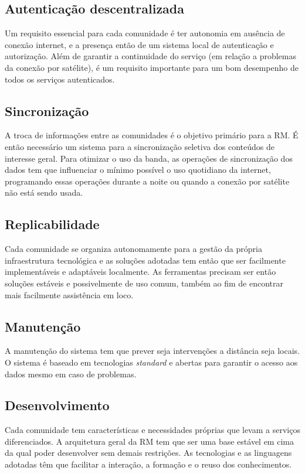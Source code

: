 \subsection{Autenticação descentralizada}
\label{sec:AutDec}
Um requisito essencial para cada comunidade é ter autonomia em
ausência de conexão internet, e a presença então de um sistema local
de autenticação e autorização. Além de garantir a continuidade do
serviço (em relação a problemas da conexão por satélite), é um
requisito importante para um bom desempenho de todos os serviços autenticados. 

\subsection{Sincronização}\label{sec:Sinc}
A troca de informações entre as comunidades é o objetivo primário para
a RM. É então necessário um sistema para a sincronização seletiva dos
conteúdos de interesse geral. Para otimizar o uso da banda, as
operações de sincronização dos dados tem que influenciar o mínimo
possível o uso quotidiano da internet, programando essas operações
durante a noite ou quando a conexão por satélite não está sendo usada.

\subsection{Replicabilidade}
Cada comunidade se organiza autonomamente para a gestão da própria
infraestrutura tecnológica e as soluções adotadas tem então que ser
facilmente implementáveis e adaptáveis localmente. As ferramentas
precisam ser então soluções estáveis e possivelmente de uso comum,
também ao fim de encontrar mais facilmente assistência em loco. 

\subsection{Manutenção}
A manutenção do sistema tem que prever seja intervenções a distância
seja locais. O sistema é baseado em tecnologias \emph{standard} e
abertas para garantir o acesso aos dados mesmo em caso de problemas.

\subsection{Desenvolvimento}
Cada comunidade tem características e necessidades próprias que levam
a serviços diferenciados. A arquitetura geral da RM tem que ser uma
base estável em cima da qual poder desenvolver sem demais restrições.
As tecnologias e as linguagens adotadas têm que facilitar a interação,
a formação e o reuso dos conhecimentos. 

